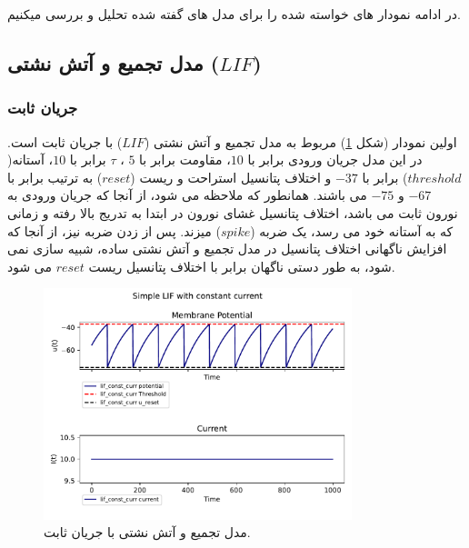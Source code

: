 \documentclass{article}
\begin{document}
        در ادامه نمودار های خواسته شده را برای مدل های گفته شده تحلیل و بررسی میکنیم.

        \subsection{مدل تجمیع و آتش نشتی ($LIF$)}
            \subsubsection{جریان ثابت}
            اولین نمودار
            (شکل \ref{fig:lif-const-curr})
            مربوط به مدل تجمیع و آتش نشتی
            ($LIF$) 
            با جریان ثابت است. در این مدل جریان ورودی برابر با 
            $10$، 
            مقاومت برابر با 
            $5$ ، 
            $\tau$ 
            برابر با 
            $10$،  
            آستانه($threshold$) 
            برابر با 
            $-37$ 
            و اختلاف پتانسیل استراحت و ریست
            ($reset$) 
            به ترتیب برابر با 
            $-67$ و
            $-75$ 
            می باشند. همانطور که ملاحظه می شود، از آنجا که جریان ورودی به نورون ثابت می باشد، اختلاف پتانسیل غشای نورون در ابتدا به تدریج بالا رفته و زمانی که به آستانه خود می رسد، یک ضربه
            ($spike$) 
            میزند. پس از زدن ضربه نیز، از آنجا که افزایش ناگهانی اختلاف پتانسیل در مدل تجمیع و آتش نشتی ساده، شبیه سازی نمی شود، به طور دستی ناگهان برابر با اختلاف پتانسیل ریست
            $reset$ 
            می شود.

            \begin{figure}[h]
                \centering
                \includegraphics[width=0.8\textwidth]{plots/Simple LIF with constant current.pdf} %
                \caption{مدل تجمیع و آتش نشتی با جریان ثابت.}
                \label{fig:lif-const-curr}
            \end{figure}
\end{document}
